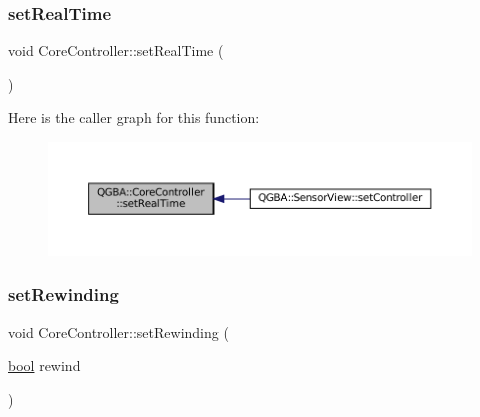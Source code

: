 \subsubsection{\texorpdfstring{set\+Real\+Time}{setRealTime}}
{\footnotesize\ttfamily void Core\+Controller\+::set\+Real\+Time (\begin{DoxyParamCaption}{ }\end{DoxyParamCaption})\hspace{0.3cm}{\ttfamily [slot]}}

Here is the caller graph for this function\+:
\nopagebreak
\begin{figure}[H]
\begin{center}
\leavevmode
\includegraphics[width=350pt]{class_q_g_b_a_1_1_core_controller_a0d6489c3a46a52b7cc84ec28f36790be_icgraph}
\end{center}
\end{figure}
\mbox{\label{class_q_g_b_a_1_1_core_controller_a66b4d11936198f097b2004a2a64b4c02}} 
\subsubsection{\texorpdfstring{set\+Rewinding}{setRewinding}}
{\footnotesize\ttfamily void Core\+Controller\+::set\+Rewinding (\begin{DoxyParamCaption}\item[{\mbox{\hyperlink{libretro_8h_a4a26dcae73fb7e1528214a068aca317e}{bool}}}]{rewind }\end{DoxyParamCaption})\hspace{0.3cm}{\ttfamily [slot]}}

